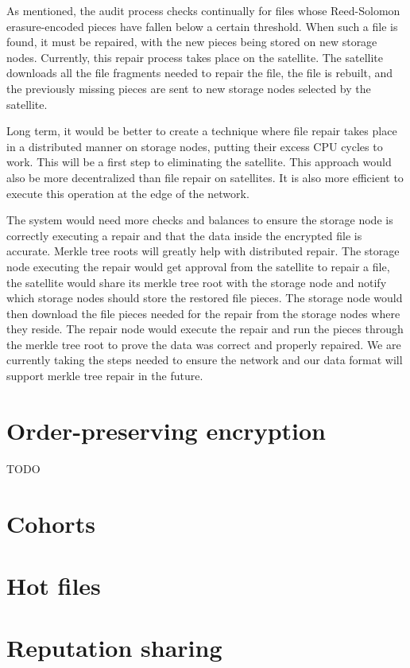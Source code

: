 \documentclass[11pt,fleqn,openany]{book}
\newcommand{\todo}[1]{{\color{red} TODO #1 }}
\begin{document}
As mentioned, the audit process checks continually for files whose Reed-Solomon
erasure-encoded pieces have fallen below a certain threshold. When such a file
is found, it must be repaired, with
the new pieces being stored on new storage nodes.
Currently, this
repair process takes place on the satellite. The satellite downloads all
the file fragments needed to repair the file, the file is rebuilt, and the
previously missing pieces are sent to new storage nodes
selected by the satellite.

Long term, it would be better to create a technique where file repair takes
place in a distributed manner on storage nodes, putting their excess CPU
cycles
to work. This will be a first step to eliminating the satellite. This
approach would also be more decentralized than file repair on satellites. It
is also more efficient to execute this operation at the edge of the network.

The system would need more checks and balances to ensure the storage node is
correctly
executing a repair and that the data inside the encrypted file is accurate.
Merkle tree roots will greatly help with distributed repair. The storage
node
executing the repair would get approval from the satellite to repair a file,
the satellite would share its merkle tree root with the storage node and
notify
which storage nodes should store the restored file pieces. The storage node
would then
download the file pieces needed for the repair from the storage nodes where they
reside. The repair node would execute the repair and run the pieces
through the merkle tree root to prove the data was correct and properly
repaired. We are currently taking the steps needed to ensure the network and our
data format will support merkle tree repair in the future.

\section{Order-preserving encryption}

\todo{}

\section{Cohorts}
\section{Hot files}
\section{Reputation sharing}
\end{document}
